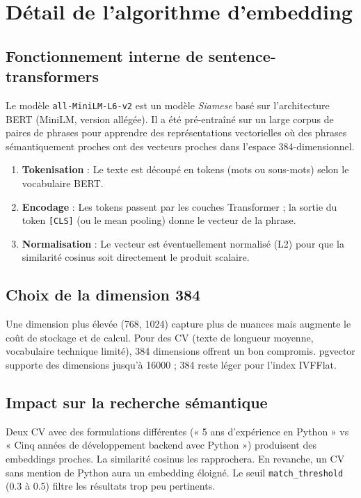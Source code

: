 \documentclass[11pt,a4paper]{report}
\begin{document}
\section{Détail de l'algorithme d'embedding}

\subsection{Fonctionnement interne de sentence-transformers}

Le modèle \texttt{all-MiniLM-L6-v2} est un modèle \textit{Siamese} basé sur l'architecture BERT (MiniLM, version allégée). Il a été pré-entraîné sur un large corpus de paires de phrases pour apprendre des représentations vectorielles où des phrases sémantiquement proches ont des vecteurs proches dans l'espace 384-dimensionnel.

\begin{enumerate}[leftmargin=*]
  \item \textbf{Tokenisation} : Le texte est découpé en tokens (mots ou sous-mots) selon le vocabulaire BERT.
  \item \textbf{Encodage} : Les tokens passent par les couches Transformer ; la sortie du token \texttt{[CLS]} (ou le mean pooling) donne le vecteur de la phrase.
  \item \textbf{Normalisation} : Le vecteur est éventuellement normalisé (L2) pour que la similarité cosinus soit directement le produit scalaire.
\end{enumerate}

\subsection{Choix de la dimension 384}

Une dimension plus élevée (768, 1024) capture plus de nuances mais augmente le coût de stockage et de calcul. Pour des CV (texte de longueur moyenne, vocabulaire technique limité), 384 dimensions offrent un bon compromis. pgvector supporte des dimensions jusqu'à 16000 ; 384 reste léger pour l'index IVFFlat.

\subsection{Impact sur la recherche sémantique}

Deux CV avec des formulations différentes (« 5 ans d'expérience en Python » vs « Cinq années de développement backend avec Python ») produisent des embeddings proches. La similarité cosinus les rapprochera. En revanche, un CV sans mention de Python aura un embedding éloigné. Le seuil \texttt{match\_threshold} (0.3 à 0.5) filtre les résultats trop peu pertinents.
\end{document}
